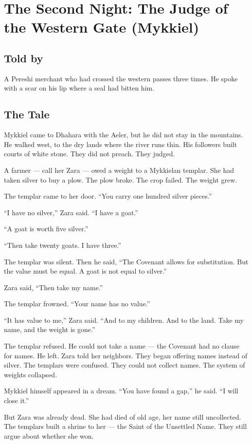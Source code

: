 \documentclass[10pt,twoside]{book}
\begin{document}
\chapter{The Second Night: The Judge of the Western Gate (Mykkiel)}

\section*{Told by}
A Pereshi merchant who had crossed the western passes three times. He spoke with a scar on his lip where a seal had bitten him.

\section*{The Tale}
Mykkiel came to Dhahara with the Aeler, but he did not stay in the mountains. He walked west, to the dry lands where the river runs thin. His followers built courts of white stone. They did not preach. They judged.

A farmer --- call her Zara --- owed a weight to a Mykkielan templar. She had taken silver to buy a plow. The plow broke. The crop failed. The weight grew.

The templar came to her door. ``You carry one hundred silver pieces.''

``I have no silver,'' Zara said. ``I have a goat.''

``A goat is worth five silver.''

``Then take twenty goats. I have three.''

The templar was silent. Then he said, ``The Covenant allows for substitution. But the value must be equal. A goat is not equal to silver.''

Zara said, ``Then take my name.''

The templar frowned. ``Your name has no value.''

``It has value to me,'' Zara said. ``And to my children. And to the land. Take my name, and the weight is gone.''

The templar refused. He could not take a name --- the Covenant had no clause for names. He left. Zara told her neighbors. They began offering names instead of silver. The templars were confused. They could not collect names. The system of weights collapsed.

Mykkiel himself appeared in a dream. ``You have found a gap,'' he said. ``I will close it.''

But Zara was already dead. She had died of old age, her name still uncollected. The templars built a shrine to her --- the Saint of the Unsettled Name. They still argue about whether she won.
\end{document}
